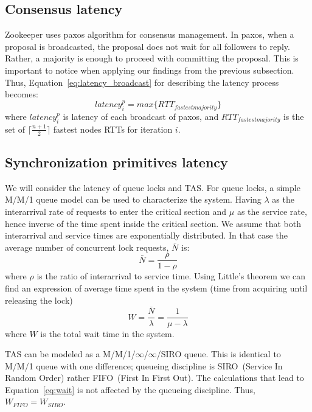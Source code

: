 \subsection{Consensus latency}
Zookeeper uses paxos algorithm for consensus management. In paxos, when a proposal is broadcasted, the proposal does not wait for all followers to reply. Rather, a majority is enough to proceed with committing the proposal. This is important to notice when applying our findings from the previous subsection. Thus, Equation~\ref{eq:latency_broadcast} for describing the latency process becomes:
\begin{equation}
latency^p_i = max \{ RTT_{fastest majority} \}
\end{equation}
where $latency^p_i$ is latency of each broadcast of paxos, and $RTT_{fastest majority}$ is the set of $\lceil\frac{n + 1}{2}\rceil $ fastest nodes RTTs for iteration $i$.

\subsection{Synchronization primitives latency}
We will consider the latency of queue locks and TAS. For queue locks, a simple M/M/1 queue model can be used to characterize the system. Having $\lambda$ as the interarrival rate of requests to enter the critical section and $\mu$ as the service rate, hence inverse of the time spent inside the critical section. We assume that both interarrival and service times are exponentially distributed. In that case the average number of concurrent lock requests, $\bar{N}$ is:
\begin{equation}
\bar{N} = \frac{\rho}{1 - \rho}
\end{equation}
where $\rho$ is the ratio of interarrival to service time. Using Little's theorem we can find an expression of average time spent in the system (time from acquiring until releasing the lock)
\begin{equation}
\label{eq:wait}
W = \frac{\bar{N}}{\lambda} = \frac{1}{\mu - \lambda}
\end{equation}
where $W$ is the total wait time in the system.

TAS can be modeled as a M/M/1/$\infty$/$\infty$/SIRO queue. This is identical to M/M/1 queue with one difference; queueing discipline is SIRO~(Service In Random Order) rather FIFO~(First In First Out). The calculations that lead to Equation~\ref{eq:wait} is not affected by the queueing discipline. Thus, $W_{FIFO} = W_{SIRO}$.

